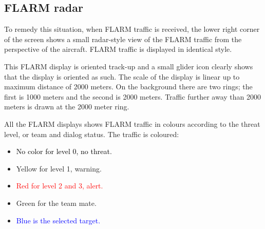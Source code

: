 \documentclass[a4paper,12pt]{refrep}
\begin{document}
\subsection*{FLARM radar}

To remedy this situation, when FLARM traffic is received, the lower
right corner of the screen shows a small radar-style view of the FLARM
traffic from the perspective of the aircraft.  FLARM traffic is
displayed in identical style.

This FLARM display is oriented track-up and a small glider icon
clearly shows that the display is oriented as such.  The scale of the
display is linear up to maximum distance of 2000 meters.  On the
background there are two rings; the first is 1000 meters and the second 
is 2000 meters.  Traffic further away than 2000 meters is drawn at the 2000 meter ring.

All the FLARM displays shows FLARM traffic in colours according to
the threat level, or team and dialog status.  The traffic is coloured:
\begin{itemize}
\item \textcolor{black} {No color for level 0, no threat.} 
\item \textcolor{warning} { Yellow for level 1, warning.}
\item \textcolor{red} {Red for level 2 and 3, alert.}
\item \textcolor{teammate} {Green for the team mate.}
\item \textcolor{blue} {Blue is the selected target.}
\end{itemize}
\end{document}
